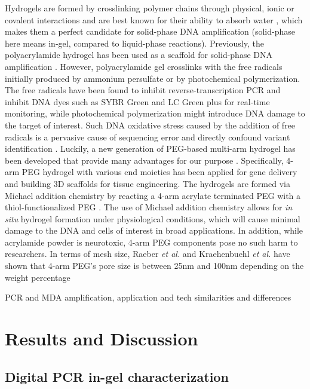 Hydrogels are formed by crosslinking polymer chains through physical, ionic or covalent interactions and are best known for their ability to absorb water \cite{Elisseeff:2008cm}, which makes them a perfect candidate for solid-phase DNA amplification (solid-phase here means in-gel, compared to liquid-phase reactions). Previously, the polyacrylamide hydrogel has been used as a scaffold for solid-phase DNA amplification \cite{Mitra:1999ty}. However, polyacrylamide gel crosslinks with the free radicals initially produced by ammonium persulfate or by photochemical polymerization. The free radicals have been found to inhibit reverse-transcription PCR and inhibit DNA dyes such as SYBR Green and LC Green plus \cite{Atrazhev:2010ex} for real-time monitoring, while photochemical polymerization might introduce DNA damage to the target of interest. Such DNA oxidative stress caused by the addition of free radicals is a pervasive cause of sequencing error and directly confound variant identification \cite{Chen:2017dq}. Luckily, a new generation of PEG-based multi-arm hydrogel has been developed that provide many advantages for our purpose \cite{Tan:2010by}. Specifically, 4-arm PEG hydrogel with various end moieties has been applied for gene delivery and building 3D scaffolds for tissue engineering. The hydrogels are formed via Michael addition chemistry by reacting a 4-arm acrylate terminated PEG with a thiol-functionalized PEG \cite{Li:2012bd}. The use of Michael addition chemistry allows for \textit{in situ} hydrogel formation under physiological conditions, which will cause minimal damage to the DNA and cells of interest in broad applications. In addition, while acrylamide powder is neurotoxic, 4-arm PEG components pose no such harm to researchers. In terms of mesh size, Raeber \textit{et al.} and Kraehenbuehl \textit{et al.} have shown that 4-arm PEG's pore size is between 25nm and 100nm depending on the weight percentage \cite{Raeber:2005cq,Kraehenbuehl:2008do}


PCR and MDA amplification, application and tech similarities and differences 


\section{Results and Discussion}
\subsection{Digital PCR in-gel characterization}

